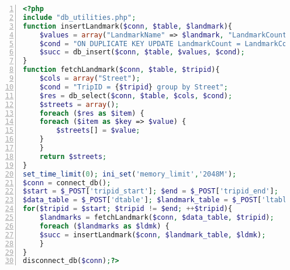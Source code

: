 \begin{lstlisting}[language = PHP, caption = {Landmark Frequency}, label = {AList:ldmk_frequency}, frame=single, numbers=left, stepnumber=1]
<?php
include "db_utilities.php";
function insertLandmark($conn, $table, $landmark){
    $values = array("LandmarkName" => $landmark, "LandmarkCount" => 1);
    $cond = "ON DUPLICATE KEY UPDATE LandmarkCount = LandmarkCount + 1";
    $succ = db_insert($conn, $table, $values, $cond);
}
function fetchLandmark($conn, $table, $tripid){
    $cols = array("Street");
    $cond = "TripID = {$tripid} group by Street";
    $res = db_select($conn, $table, $cols, $cond);
    $streets = array();
    foreach ($res as $item) {
	foreach ($item as $key => $value) {
	    $streets[] = $value;
	}
    }
    return $streets;
}
set_time_limit(0); ini_set('memory_limit','2048M');
$conn = connect_db();
$start = $_POST['tripid_start']; $end = $_POST['tripid_end'];
$data_table = $_POST['dtable']; $landmark_table = $_POST['ltable'];
for($tripid = $start; $tripid != $end; ++$tripid){
    $landmarks = fetchLandmark($conn, $data_table, $tripid);
    foreach ($landmarks as $ldmk) {
  	$succ = insertLandmark($conn, $landmark_table, $ldmk);
    }
}
disconnect_db($conn);?>
\end{lstlisting}


